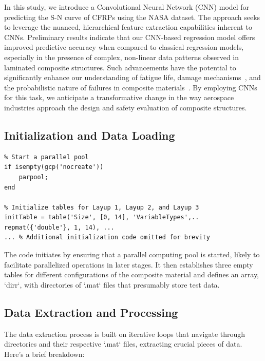 In this study, we introduce a Convolutional Neural Network (CNN) model for predicting the S-N curve of CFRPs using the NASA dataset. The approach seeks to leverage the nuanced, hierarchical feature extraction capabilities inherent to CNNs. Preliminary results indicate that our CNN-based regression model offers improved predictive accuracy when compared to classical regression models, especially in the presence of complex, non-linear data patterns observed in laminated composite structures. Such advancements have the potential to significantly enhance our understanding of fatigue life, damage mechanisms~\cite{talreja2012damage}, and the probabilistic nature of failures in composite materials~\cite{glaessgen2009probabilistic}. By employing CNNs for this task, we anticipate a transformative change in the way aerospace industries approach the design and safety evaluation of composite structures.

\subsection{Initialization and Data Loading}

\begin{lstlisting}
% Start a parallel pool
if isempty(gcp('nocreate'))
    parpool;
end

% Initialize tables for Layup 1, Layup 2, and Layup 3
initTable = table('Size', [0, 14], 'VariableTypes',..
repmat({'double'}, 1, 14), ...
... % Additional initialization code omitted for brevity
\end{lstlisting}

The code initiates by ensuring that a parallel computing pool is started, likely to facilitate parallelized operations in later stages. It then establishes three empty tables for different configurations of the composite material and defines an array, `dirr`, with directories of `.mat` files that presumably store test data. 
\subsection{Data Extraction and Processing}

The data extraction process is built on iterative loops that navigate through directories and their respective `.mat` files, extracting crucial pieces of data. Here's a brief breakdown:

